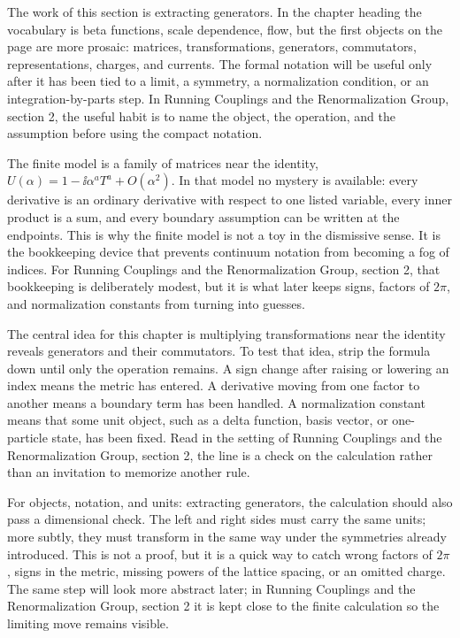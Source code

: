 The work of this section is extracting generators.  In the chapter heading the vocabulary is beta functions, scale dependence, flow, but the first objects on the page are more prosaic: matrices, transformations, generators, commutators, representations, charges, and currents.  The formal notation will be useful only after it has been tied to a limit, a symmetry, a normalization condition, or an integration-by-parts step.  In Running Couplings and the Renormalization Group, section 2, the useful habit is to name the object, the operation, and the assumption before using the compact notation.

The finite model is a family of matrices near the identity, \(U(\alpha)=1-\ii\alpha^aT^a+O(\alpha^2)\).  In that model no mystery is available: every derivative is an ordinary derivative with respect to one listed variable, every inner product is a sum, and every boundary assumption can be written at the endpoints.  This is why the finite model is not a toy in the dismissive sense.  It is the bookkeeping device that prevents continuum notation from becoming a fog of indices.  For Running Couplings and the Renormalization Group, section 2, that bookkeeping is deliberately modest, but it is what later keeps signs, factors of \(2\pi\), and normalization constants from turning into guesses.

The central idea for this chapter is multiplying transformations near the identity reveals generators and their commutators.  To test that idea, strip the formula down until only the operation remains.  A sign change after raising or lowering an index means the metric has entered.  A derivative moving from one factor to another means a boundary term has been handled.  A normalization constant means that some unit object, such as a delta function, basis vector, or one-particle state, has been fixed.  Read in the setting of Running Couplings and the Renormalization Group, section 2, the line is a check on the calculation rather than an invitation to memorize another rule.

For objects, notation, and units: extracting generators, the calculation should also pass a dimensional check.  The left and right sides must carry the same units; more subtly, they must transform in the same way under the symmetries already introduced.  This is not a proof, but it is a quick way to catch wrong factors of \(2\pi\), signs in the metric, missing powers of the lattice spacing, or an omitted charge.  The same step will look more abstract later; in Running Couplings and the Renormalization Group, section 2 it is kept close to the finite calculation so the limiting move remains visible.

